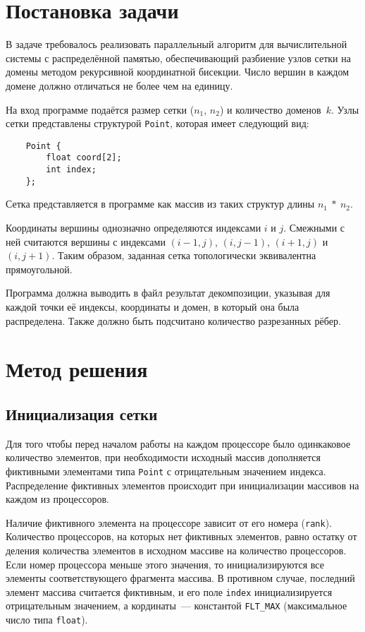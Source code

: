 \documentclass[oneside,final,14pt]{extreport}
\begin{document}
{\let\clearpage\relax \chapter*{Постановка задачи}}

В задаче требовалось реализовать параллельный алгоритм для вычислительной
системы с распределённой памятью, обеспечивающий разбиение узлов сетки
на домены методом рекурсивной координатной бисекции. Число вершин в каждом
домене должно отличаться не более чем на единицу.

На вход программе подаётся размер сетки ($n_1$, $n_2$) и количество доменов~$k$. Узлы сетки
представлены структурой \texttt{Point}, которая имеет следующий вид:
\begin{verbatim}
    Point {
        float coord[2];
        int index;
    };
\end{verbatim}
Сетка представляется в программе как массив из таких структур длины $n_1~*~n_2$.

Координаты вершины однозначно определяются индексами $i$ и $j$. Смежными с
ней считаются вершины с индексами $(i - 1, j)$, $(i, j - 1)$, $(i + 1, j)$
и $(i, j + 1)$. Таким образом, заданная сетка топологически эквивалентна
прямоугольной.

Программа должна выводить в файл результат декомпозиции, указывая для
каждой точки её индексы, координаты и домен, в который она была распределена.
Также должно быть подсчитано количество разрезанных рёбер.

\chapter*{Метод решения}

\section*{Инициализация сетки}

Для того чтобы перед началом работы на каждом процессоре было одинкаковое количество
элементов, при необходимости
исходный массив дополняется фиктивными элементами типа \texttt{Point} с
отрицательным значением индекса. Распределение фиктивных элементов происходит
при инициализации массивов на каждом из процессоров.

Наличие фиктивного элемента на процессоре зависит от его номера (\texttt{rank}).
Количество процессоров, на которых нет фиктивных элементов, равно остатку от
деления количества элементов в исходном массиве на количество процессоров.
Если номер процессора меньше этого значения, то инициализируются все элементы
соответствующего фрагмента массива. В противном случае, последний элемент
массива считается фиктивным, и его поле \texttt{index} инициализируется
отрицательным значением, а кординаты~--- константой \texttt{FLT\_MAX}
(максимальное число типа \texttt{float}).
\end{document}
